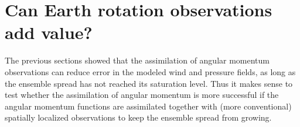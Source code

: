 
\section{Can Earth rotation observations add value?}

The previous sections showed that the assimilation of angular momentum observations can reduce error in the modeled wind and pressure fields, as long as the ensemble spread has not reached its saturation level. 
Thus it makes sense to test whether the assimilation of angular momentum is more successful if the angular momentum functions are assimilated together with (more conventional) spatially localized observations to keep the ensemble spread from growing.

